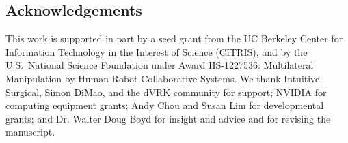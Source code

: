 \documentclass[letterpaper, 10 pt, conference]{ieeeconf}
\begin{document}
\begin{abstract}

\end{abstract} 








\subsection*{Acknowledgements}
\label{sec:ack}
{\small This work is supported in part by a seed grant from the UC Berkeley Center for Information Technology in the Interest of Science (CITRIS), and by the U.S.\ National Science Foundation under Award IIS-1227536: Multilateral Manipulation by Human-Robot Collaborative Systems. We thank Intuitive Surgical, Simon DiMao, and the dVRK community for support; NVIDIA for computing equipment grants; Andy Chou and Susan Lim for developmental grants; and Dr. Walter Doug Boyd for insight and advice and  for revising the manuscript.}



\end{document}
